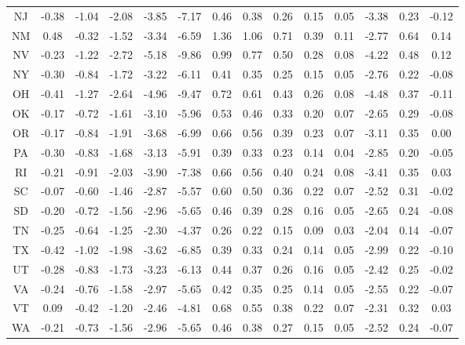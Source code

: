 \begin{table}
\begin{tabular}{cccccccccccccc}
   NJ & -0.38 & -1.04 & -2.08 & -3.85 & -7.17 &  0.46 &  0.38 &  0.26 &  0.15 &  0.05 &   -3.38 &     0.23 &     -0.12 \\
   NM &  0.48 & -0.32 & -1.52 & -3.34 & -6.59 &  1.36 &  1.06 &  0.71 &  0.39 &  0.11 &   -2.77 &     0.64 &      0.14 \\
   NV & -0.23 & -1.22 & -2.72 & -5.18 & -9.86 &  0.99 &  0.77 &  0.50 &  0.28 &  0.08 &   -4.22 &     0.48 &      0.12 \\
   NY & -0.30 & -0.84 & -1.72 & -3.22 & -6.11 &  0.41 &  0.35 &  0.25 &  0.15 &  0.05 &   -2.76 &     0.22 &     -0.08 \\
   OH & -0.41 & -1.27 & -2.64 & -4.96 & -9.47 &  0.72 &  0.61 &  0.43 &  0.26 &  0.08 &   -4.48 &     0.37 &     -0.11 \\
   OK & -0.17 & -0.72 & -1.61 & -3.10 & -5.96 &  0.53 &  0.46 &  0.33 &  0.20 &  0.07 &   -2.65 &     0.29 &     -0.08 \\
   OR & -0.17 & -0.84 & -1.91 & -3.68 & -6.99 &  0.66 &  0.56 &  0.39 &  0.23 &  0.07 &   -3.11 &     0.35 &      0.00 \\
   PA & -0.30 & -0.83 & -1.68 & -3.13 & -5.91 &  0.39 &  0.33 &  0.23 &  0.14 &  0.04 &   -2.85 &     0.20 &     -0.05 \\
   RI & -0.21 & -0.91 & -2.03 & -3.90 & -7.38 &  0.66 &  0.56 &  0.40 &  0.24 &  0.08 &   -3.41 &     0.35 &      0.03 \\
   SC & -0.07 & -0.60 & -1.46 & -2.87 & -5.57 &  0.60 &  0.50 &  0.36 &  0.22 &  0.07 &   -2.52 &     0.31 &     -0.02 \\
   SD & -0.20 & -0.72 & -1.56 & -2.96 & -5.65 &  0.46 &  0.39 &  0.28 &  0.16 &  0.05 &   -2.65 &     0.24 &     -0.08 \\
   TN & -0.25 & -0.64 & -1.25 & -2.30 & -4.37 &  0.26 &  0.22 &  0.15 &  0.09 &  0.03 &   -2.04 &     0.14 &     -0.07 \\
   TX & -0.42 & -1.02 & -1.98 & -3.62 & -6.85 &  0.39 &  0.33 &  0.24 &  0.14 &  0.05 &   -2.99 &     0.22 &     -0.10 \\
   UT & -0.28 & -0.83 & -1.73 & -3.23 & -6.13 &  0.44 &  0.37 &  0.26 &  0.16 &  0.05 &   -2.42 &     0.25 &     -0.02 \\
   VA & -0.24 & -0.76 & -1.58 & -2.97 & -5.65 &  0.42 &  0.35 &  0.25 &  0.14 &  0.05 &   -2.55 &     0.22 &     -0.07 \\
   VT &  0.09 & -0.42 & -1.20 & -2.46 & -4.81 &  0.68 &  0.55 &  0.38 &  0.22 &  0.07 &   -2.31 &     0.32 &      0.03 \\
   WA & -0.21 & -0.73 & -1.56 & -2.96 & -5.65 &  0.46 &  0.38 &  0.27 &  0.15 &  0.05 &   -2.52 &     0.24 &     -0.07 \\

\end{tabular}
\end{table}
